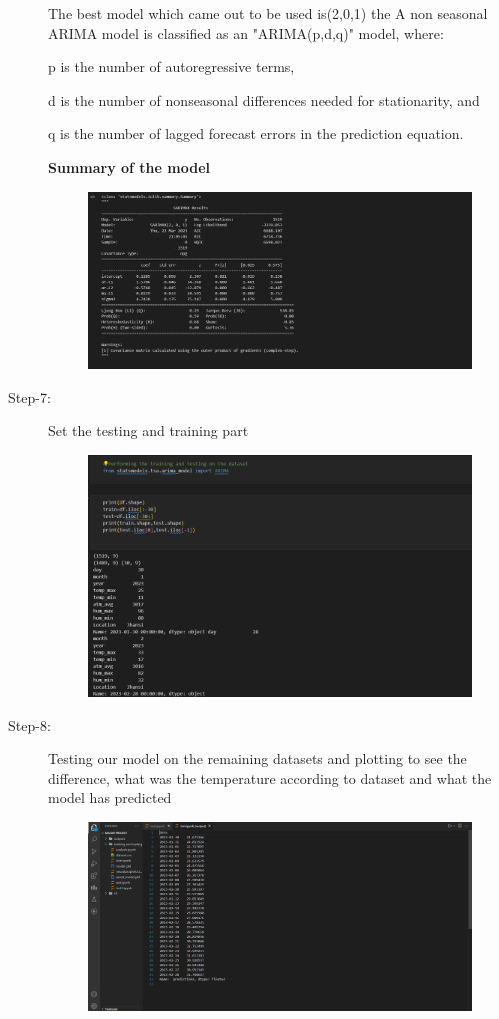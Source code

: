 \begin{description}
The best model which came out to be used is(2,0,1) the
 A non seasonal ARIMA model is classified as an "ARIMA(p,d,q)" model, where:
 
 p is the number of autoregressive terms,

d is the number of nonseasonal differences needed for stationarity, and

q is the number of lagged forecast errors in the prediction equation.

\textbf{Summary of the model}

 \begin{figure}[hbt!]
  \centering
  \includegraphics[width=0.8\linewidth]{images/outputs/7.png}
\end{figure}

\pagebreak
\item[Step-7:] Set the testing and training part

 \begin{figure}[hbt!]
  \centering
  \includegraphics[width=0.7\linewidth]{images/outputs/8.png}
\end{figure}

\item[Step-8:] Testing our model on the remaining datasets and plotting to see the difference, what was the temperature according to dataset and what the model has predicted
 \begin{figure}[hbt!]
  \centering
\includegraphics[width=0.7\linewidth]{images/outputs/9.png}
\end{figure}


\end{description}
